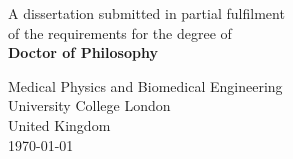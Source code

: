 \begin{titlepage}
  \pagestyle{empty}

  \vspace*{1cm}

  \begin{center}
    \LARGE
    \textbf{\thetitle}
  \end{center}

  \vspace{1.5cm}

  \begin{center}
    \Large
    \theauthor
  \end{center}

  \vfill

  \begin{center}
    \normalsize
    A dissertation submitted in partial fulfilment \\
    of the requirements for the degree of \\
    \textbf{Doctor of Philosophy}
  \end{center}

  \vspace{0.8cm}

  \begin{center}
    \large
    Medical Physics and Biomedical Engineering \\
    University College London \\
    United Kingdom \\
    \today
  \end{center}
\end{titlepage}
